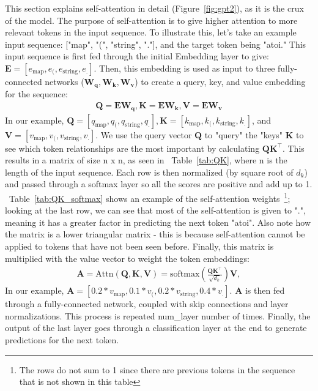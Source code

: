 \documentclass[nonacm, sigconf]{acmart}
\newcommand{\squarepara}[1]{\left[{#1}\right]}
\def\spara{\squarepara}
\renewcommand{\vec}[1]{\boldsymbol{#1}}
\newcommand{\mat}[1]{\boldsymbol{#1}}
\newcommand{\softmax}{\text{softmax}}
\newcommand{\Attn}{\text{Attn}}
\newcommand{\tabref}[1]{Table~\ref{#1}}
\begin{document}
This section explains self-attention in detail (Figure~\ref{fig:gpt2}), as it is the crux of the model. 
The purpose of self-attention is to give higher attention to more relevant tokens in the input sequence. 
To illustrate this, let's take an example input sequence: ["map", "(", "string", "."], and the target token being "atoi." This input sequence is first fed through the initial Embedding layer to give: $\vec{E} = \spara{e_\text{map}, e_\text{(}, e_\text{string}, e_\text{.}}$. Then, this embedding is used as input to three fully-connected networks ($\mat{W_q}, \mat{W_k}, \mat{W_v}$) to create a query, key, and value embedding for the sequence: 
\begin{gather*}
  \vec{Q} = \vec{E} \mat{W_q},   \vec{K} = \vec{E} \mat{W_k},  \vec{V} = \vec{E} \mat{W_v}
\end{gather*}
In our example, $\vec{Q} = \spara{q_\text{map}, q_\text{(}, q_\text{string}, q_\text{.}}, \vec{K} = \spara{k_\text{map}, k_\text{(}, k_\text{string}, k_\text{.}}$, and $\vec{V} = \spara{v_\text{map}, v_\text{(}, v_\text{string}, v_\text{.}}$. We use the query vector $\vec{Q}$ to "query" the "keys" $\vec{K}$ to see which token relationships are the most important by calculating $\vec{Q}\vec{K}^\intercal$. This results in a matrix of size n x n, as seen in ~\tabref{tab:QK}, where n is the length of the input sequence. Each row is then normalized (by square root of $d_{k}$) and passed through a softmax layer so all the scores are positive and add up to 1. ~\tabref{tab:QK_softmax}  shows an example of the self-attention weights~\footnote{The rows do not sum to 1 since there are previous tokens in the sequence that is not shown in this table}; looking at the last row, we can see that most of the self-attention is given to ".", meaning it has a greater factor in predicting the next token "atoi". Also note how the matrix is a lower triangular matrix - this is because self-attention cannot be applied to tokens that have not been seen before. Finally, this matrix is multiplied with the value vector to weight the token embeddings:
\begin{gather*}
    \mat{A} = \Attn(\mat{Q}, \mat{K}, \mat{V} ) = \softmax(\frac{\mat{Q} \mat{K}^\top}{\sqrt{d_k}}) \mat{V},
\end{gather*}
In our example, $\vec{A} = \spara{0.2 * v_\text{map}, 0.1 * v_\text{(}, 0.2 * v_\text{string}, 0.4 * v_\text{.}}$.
$\mat{A}$ is then fed through a fully-connected network, coupled with skip connections and layer normalizations. This process is repeated num\_layer number of times. Finally, the output of the last layer goes through a classification layer at the end to generate predictions for the next token.
\end{document}
